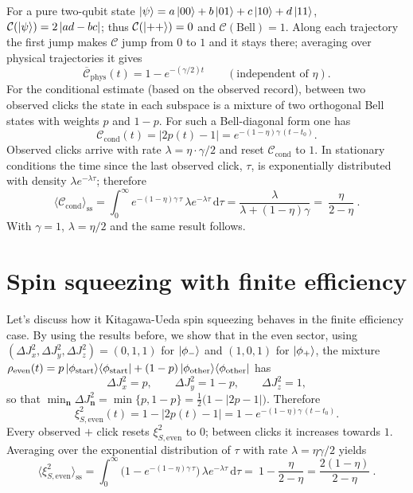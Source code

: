 \documentclass[12pt,a4paper]{article}
\begin{document}
	For a pure two-qubit state \(\ket{\psi}=a\ket{00}+b\ket{01}+c\ket{10}+d\ket{11}\),
	\(\mathcal C(\ket{\psi})=2\,|ad-bc|\);
	thus \(\mathcal C(\ket{++})=0\) and \(\mathcal C(\text{Bell})=1\).
	Along each trajectory the first jump makes \(\mathcal C\) jump from \(0\) to \(1\) and it stays there; averaging over physical trajectories it gives
	\[
	\overline{\mathcal C}_{\mathrm{phys}}(t)=1-e^{-(\gamma/2)t}\qquad(\text{independent of }\eta).
	\]
	For the conditional estimate (based on the observed record), between two observed clicks the state in each subspace is a mixture of two orthogonal Bell states with weights \(p\) and \(1-p\).
	For such a Bell-diagonal form one has
	\[
	\mathcal C_{\mathrm{cond}}(t)=|2p(t)-1|=e^{-(1-\eta)\gamma\,(t-t_0)}.
	\]
	Observed clicks arrive with rate \(\lambda=\eta \cdot \gamma/2\) and reset \(\mathcal C_{\mathrm{cond}}\) to \(1\).
	In stationary conditions the time since the last observed click, \(\tau\), is exponentially distributed with density \(\lambda e^{-\lambda \tau}\);
	therefore
	\[
	\langle \mathcal C_{\mathrm{cond}}\rangle_{\mathrm{ss}}
	=\int_{0}^{\infty} e^{-(1-\eta)\gamma\,\tau}\,\lambda e^{-\lambda \tau}\,\mathrm d\tau
	=\frac{\lambda}{\lambda+(1-\eta)\gamma}
	=\boxed{\ \frac{\eta}{2-\eta}\ }.
	\]
	With \(\gamma=1\), \(\lambda=\eta/2\) and the same result follows.
	
	\section{Spin squeezing with finite efficiency}
	
	Let's discuss how it Kitagawa-Ueda spin squeezing behaves in the finite efficiency case. By using the results before, we show that in the even sector, using \((\Delta J_x^2,\Delta J_y^2,\Delta J_z^2)=(0,1,1)\) for \(\ket{\phi_-}\) and \((1,0,1)\) for \(\ket{\phi_+}\),
	the mixture \(\rho_{\mathrm{even}}(t)=p\ket{\phi_{\mathrm{start}}}\!\bra{\phi_{\mathrm{start}}}+(1-p)\ket{\phi_{\mathrm{other}}}\!\bra{\phi_{\mathrm{other}}}\) has
	\[
	\Delta J_x^2=p,\qquad \Delta J_y^2=1-p,\qquad \Delta J_z^2=1,
	\]
	so that \(\min_{\mathbf n}\Delta J_{\mathbf n}^2=\min\{p,1-p\}=\tfrac{1}{2}\big(1-|2p-1|\big)\).
	Therefore
	\[
	\xi_{S,\mathrm{even}}^2(t)=1-|2p(t)-1|=1-e^{-(1-\eta)\gamma\,(t-t_0)}.
	\]
	Every observed \(+\) click resets \(\xi_{S,\mathrm{even}}^2\) to \(0\); between clicks it increases towards \(1\).
	Averaging over the exponential distribution of \(\tau\) with rate \(\lambda=\eta\gamma/2\) yields
	\[
	\big\langle \xi_{S,\mathrm{even}}^2\big\rangle_{\mathrm{ss}}
	=\int_{0}^{\infty}\big(1-e^{-(1-\eta)\gamma\,\tau}\big)\,\lambda e^{-\lambda \tau}\,\mathrm d\tau
	=\boxed{\ 1-\frac{\eta}{2-\eta}=\frac{2(1-\eta)}{2-\eta}\ }.
	\]
	
\end{document}
